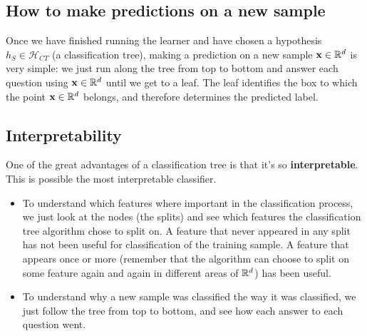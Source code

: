 \documentclass[11pt]{article}
\newcommand{\Hc}{\mathcal{H}}
\newcommand{\VV}[1]{\mathbf{#1}}
\begin{document}
 


 \subsection{How to make predictions on a new sample}

 Once we have finished running the learner and have chosen a hypothesis
 $h_S\in\Hc_{CT}$ (a classification tree), making a prediction on a new sample
 $\VV{x}\in\reals^d$ 
 is very simple: we just run along the tree from top to bottom and answer each
 question using $\VV{x}\in\reals^d$ until we get to a leaf. The leaf identifies
 the box to which the point  $\VV{x}\in\reals^d$  belongs, and therefore
 determines the predicted label.

 \subsection{Interpretability}

 One of the great advantages of a classification tree is that it's so {\bf
 interpretable}. This is possible the most interpretable classifier.
 \begin{itemize}
   \item To understand which features where important in the classification
     process, we just look at the nodes (the splits) and see which features the
     classification tree 
     algorithm chose to split on. A feature that never appeared in any split has not been
     useful for classification of the training sample. A feature that appears
     once or more (remember that the algorithm can choose to split on some
     feature again and again in different areas of $\mathbb{R}^d$) has been useful.  

   \item To
 understand why a new sample was classified the way it was classified, we just
 follow the tree from top to bottom, and see how each answer to each question
 went. 

 \end{itemize}
  
\end{document}
